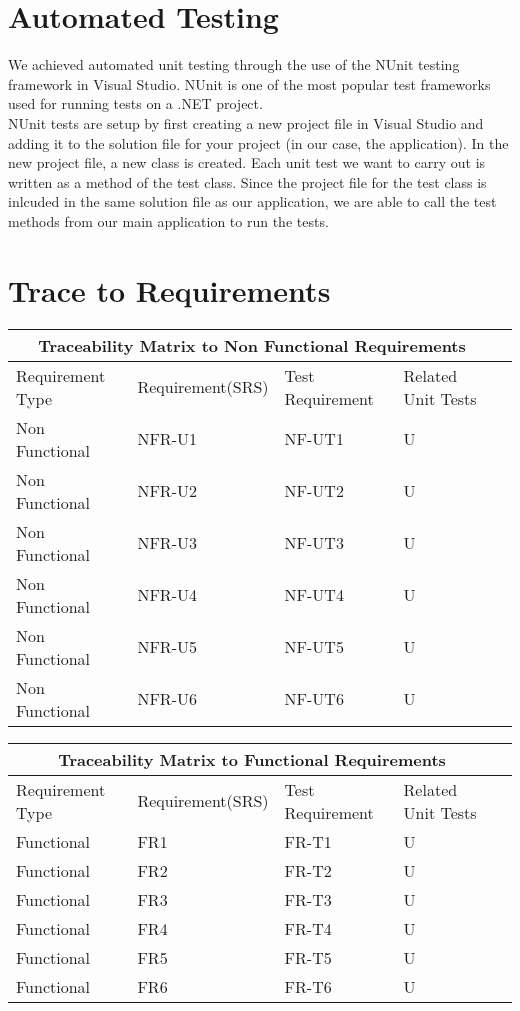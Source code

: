 \documentclass[12pt, titlepage]{article}
\begin{document}
\section{Automated Testing}

\noindent We achieved automated unit testing through the use of the NUnit testing framework in Visual Studio. NUnit is one of the most popular test frameworks used for running tests on a .NET project.\\

\noindent NUnit tests are setup by first creating a new project file in Visual Studio and adding it to the solution file for your project (in our case, the application). In the new project file, a new class is created. Each unit test we want to carry out is written as a method of the test class. Since the project file for the test class is inlcuded in the same solution file as our application, we are able to call the test methods from our main application to run the tests.\\
		
\section{Trace to Requirements}
\begin{tabular}{ |p{3cm}||p{4cm}|p{4cm}|p{4cm}|p{4cm}| }
  \hline
  \multicolumn{4}{|c|}{Traceability Matrix to Non Functional Requirements} \\
  \hline
  Requirement Type & Requirement(SRS) & Test Requirement & Related Unit Tests \\
  \hline
  Non Functional   & NFR-U1  & NF-UT1 & U \\ \hline
  Non Functional   & NFR-U2  & NF-UT2 & U \\ \hline
  Non Functional   & NFR-U3  & NF-UT3 & U \\ \hline
  Non Functional   & NFR-U4  & NF-UT4 & U \\ \hline
  Non Functional   & NFR-U5  & NF-UT5 & U \\ \hline
  Non Functional   & NFR-U6  & NF-UT6 & U \\ \hline
  
 \end{tabular}

 \begin{tabular}{ |p{3cm}||p{4cm}|p{4cm}|p{4cm}|p{4cm}| }
  \hline
  \multicolumn{4}{|c|}{Traceability Matrix to Functional Requirements} \\
  \hline
  Requirement Type & Requirement(SRS) & Test Requirement & Related Unit Tests \\
  \hline
  Functional   & FR1  & FR-T1 & U \\ \hline
  Functional   & FR2  & FR-T2 & U \\ \hline
  Functional   & FR3  & FR-T3 & U \\ \hline
  Functional   & FR4  & FR-T4 & U \\ \hline
  Functional   & FR5  & FR-T5 & U \\ \hline
  Functional   & FR6  & FR-T6 & U \\ \hline
  
 \end{tabular}
		
\end{document}
